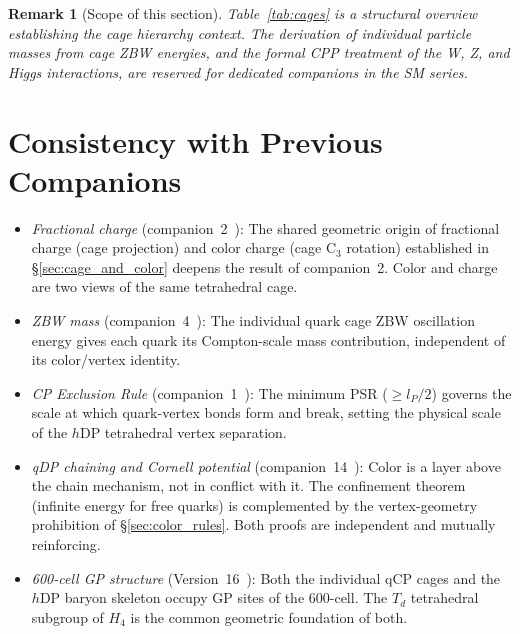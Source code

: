 \documentclass[12pt]{article}
\newtheorem{remark}[theorem]{Remark}
\newcommand{\lP}{l_P}
\newcommand{\hDP}{h\mathrm{DP}}
\begin{document}
\begin{remark}[Scope of this section]
Table~\ref{tab:cages} is a structural overview establishing the cage
hierarchy context.  The derivation of individual particle masses from
cage ZBW energies, and the formal CPP treatment of the W, Z, and Higgs
interactions, are reserved for dedicated companions in the SM series.
\end{remark}

\section{Consistency with Previous Companions}
\label{sec:consistency}

\begin{itemize}[noitemsep]
\item \emph{Fractional charge} (companion~2~\cite{c2}): The shared
  geometric origin of fractional charge (cage projection) and color
  charge (cage C$_3$ rotation) established in §\ref{sec:cage_and_color}
  deepens the result of companion~2.  Color and charge are two views
  of the same tetrahedral cage.

\item \emph{ZBW mass} (companion~4~\cite{c4}): The individual quark
  cage ZBW oscillation energy gives each quark its Compton-scale mass
  contribution, independent of its color/vertex identity.

\item \emph{CP Exclusion Rule} (companion~1~\cite{c1}): The minimum
  PSR ($\geq \lP/2$) governs the scale at which quark-vertex bonds
  form and break, setting the physical scale of the $\hDP$ tetrahedral
  vertex separation.

\item \emph{qDP chaining and Cornell potential} (companion~14~\cite{c14}):
  Color is a layer above the chain mechanism, not in conflict with it.
  The confinement theorem (infinite energy for free quarks) is
  complemented by the vertex-geometry prohibition of
  §\ref{sec:color_rules}.  Both proofs are independent and mutually
  reinforcing.

\item \emph{600-cell GP structure} (Version~16~\cite{v16}): Both the
  individual qCP cages and the $\hDP$ baryon skeleton occupy GP sites
  of the 600-cell.  The $T_d$ tetrahedral subgroup of $H_4$ is the
  common geometric foundation of both.
\end{itemize}
\end{document}
